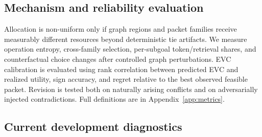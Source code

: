 \subsection{Mechanism and reliability evaluation}

\begin{table}[t]
\caption{Planned causal ablations. Each row is evaluated with the same question IDs and budget envelope.}
\label{tab:ablation}
\centering
{}
\end{table}

Allocation is non-uniform only if graph regions and packet families receive measurably different resources beyond deterministic tie artifacts. We measure operation entropy, cross-family selection, per-subgoal token/retrieval shares, and counterfactual choice changes after controlled graph perturbations. EVC calibration is evaluated using rank correlation between predicted EVC and realized utility, sign accuracy, and regret relative to the best observed feasible packet. Revision is tested both on naturally arising conflicts and on adversarially injected contradictions. Full definitions are in Appendix~\ref{app:metrics}.

\subsection{Current development diagnostics}

